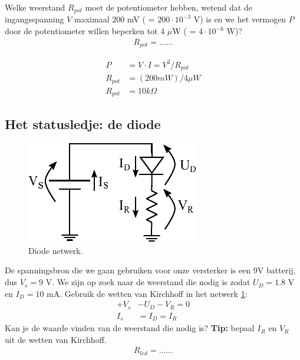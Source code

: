 \documentclass{exam}
\begin{document}
\begin{questions}
		\question
			 Welke weerstand $R_{pot}$ moet de potentiometer hebben, wetend dat de ingangsspanning $V$ maximaal $200$ mV ( = $200 \cdot 10^{-3}$ V) is en we het vermogen $P$ door de potentiometer willen beperken tot 4 $\mu$W ( = $4 \cdot 10^{-6}$ W)? 
			\begin{align*}
			    R_{pot} = \ldots\ldots
			\end{align*}

			\begin{solutionordottedlines}[1in]
				\begin{align*}
					P &= V \cdot I = V^2 / R_{pot} \\
					R_{pot} &= (200mW)/4\mu W \\
				    R_{pot} &= 10 k\Omega
				\end{align*}
			\end{solutionordottedlines}

\subsection{Het statusledje: de diode}
		\question
			\begin{figure}[htbp]
				\centering
				\includegraphics{diode_netwerk}
				\caption{Diode netwerk.}
				\label{fig:diode_netwerk}
			\end{figure}

			De spanningsbron die we gaan gebruiken voor onze versterker is een 9V batterij, dus $V_s = 9$ V. We zijn op zoek naar de weerstand die nodig is zodat $U_D = 1.8$ V en $I_D =10$ mA. Gebruik de wetten van Kirchhoff in het netwerk \ref{fig:diode_netwerk}:
				\begin{align}
					+V_s &- U_D - V_R = 0  \\
					I_s &= I_D = I_R
				\end{align}
				 Kan je de waarde vinden van de weerstand die nodig is? \textbf{Tip:} bepaal $I_R$ en $V_R$ uit de wetten van Kirchhoff.
				\begin{align*}
				    R_{led} = \ldots\ldots
				\end{align*}


\end{questions}
\end{document}
